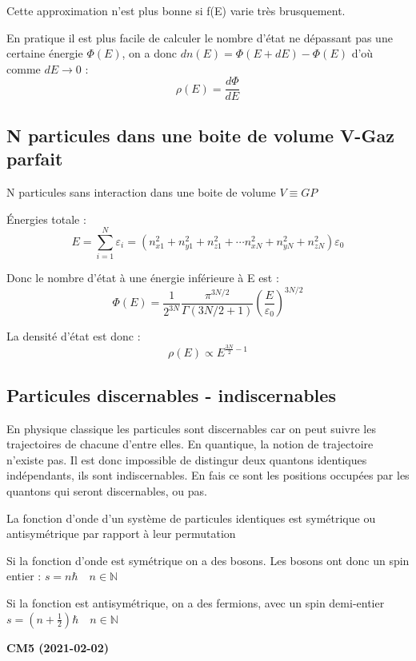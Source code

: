 \documentclass[12pt,a4paper]{report}
\newcommand{\ens}[1]{\mathbb{#1}}
\begin{document}
Cette approximation n'est plus bonne si f(E) varie très brusquement.

En pratique il est plus facile de calculer le nombre d'état ne dépassant pas une certaine énergie \(\Phi(E)\), on a donc \(dn(E) = \Phi(E+dE) - \Phi(E)\) d'où comme \(dE \rightarrow 0\) : 
\[
	\rho(E) = \dfrac{d\Phi}{dE}
\]

\subsection{N particules dans une boite de volume V-Gaz parfait}

N particules sans interaction dans une boite de volume \( V \equiv GP\)

Énergies totale :
\[
	E = \sum_{i = 1}^N \varepsilon_i = (n_{x1}^2 + n_{y1}^2 + n_{z1}^2 + \cdots n_{xN}^2 + n_{yN}^2 + n_{zN}^2)\varepsilon_0
\]

Donc le nombre d'état à  une énergie inférieure à E est :
\[
	\Phi(E) = \dfrac{1}{2^{3N}} \dfrac{\pi^{3N/2}}{\Gamma(3N/2 + 1)} \left( \dfrac{E}{\varepsilon_0}\right)^{3N/2}
\]

La densité d'état est donc :
\[
	\rho(E) \propto E^{\frac{3N}{2} - 1}
\]

\subsection{Particules discernables - indiscernables}

En physique classique les particules sont discernables car on peut suivre les trajectoires de chacune d'entre elles.
En quantique, la notion de trajectoire n'existe pas.
Il est donc impossible de distingur deux quantons identiques indépendants, ils sont indiscernables.
En fais ce sont les positions occupées par les quantons qui seront discernables, ou pas.

La fonction d'onde d'un système de particules identiques est symétrique ou antisymétrique par rapport à leur permutation

Si la fonction d'onde est symétrique on a des bosons.
Les bosons ont donc un spin entier : \(s = n \hbar \quad  n \in \ens{N}\)

Si la fonction est antisymétrique, on a des fermions, avec un spin demi-entier \(s = (n + \frac{1}{2}) \hbar \quad n \in \ens{N}\)

\begin{center}
\textbf{CM5 (2021-02-02)}
\end{center}
\end{document}
